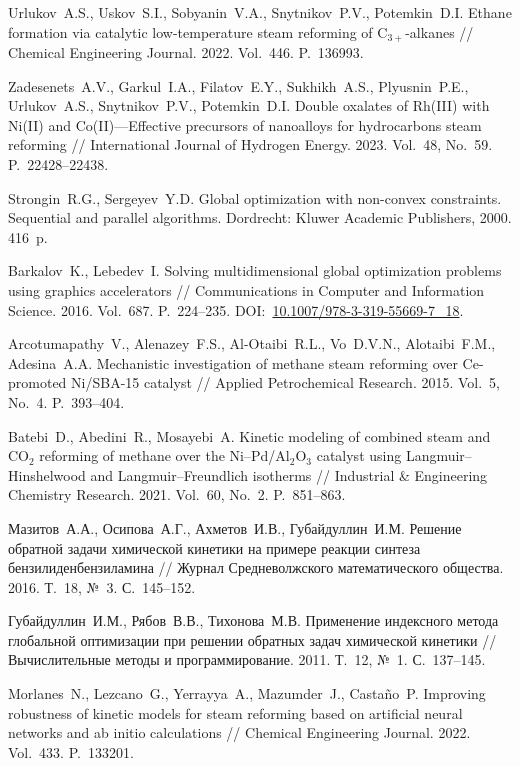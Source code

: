 \documentclass{cmi}
\begin{document}
\begin{biblio}
Urlukov~A.S., Uskov~S.I., Sobyanin~V.A., Snytnikov~P.V., Potemkin~D.I. Ethane formation via catalytic low-temperature steam reforming of C$_{3+}$-alkanes // Chemical Engineering Journal. 2022. Vol.~446. P.~136993.

Zadesenets~A.V., Garkul~I.A., Filatov~E.Y., Sukhikh~A.S., Plyusnin~P.E., Urlukov~A.S., Snytnikov~P.V., Potemkin~D.I. Double oxalates of Rh(III) with Ni(II) and Co(II)---Effective precursors of nanoalloys for hydrocarbons steam reforming // International Journal of Hydrogen Energy. 2023. Vol.~48, No.~59. P.~22428--22438.

Strongin~R.G., Sergeyev~Y.D. Global optimization with non-convex constraints. Sequential and parallel algorithms. Dordrecht: Kluwer Academic Publishers, 2000. 416~p.

Barkalov~K., Lebedev~I. Solving multidimensional global optimization problems using graphics accelerators // Communications in Computer and Information Science. 2016. Vol.~687. P.~224--235. DOI:~\href{http://dx.doi.org/10.1007/978-3-319-55669-7_18}{10.1007/978-3-319-55669-7\_18}.

Arcotumapathy~V., Alenazey~F.S., Al-Otaibi~R.L., Vo~D.V.N., Alotaibi~F.M., Adesina~A.A. Mechanistic investigation of methane steam reforming over Ce-promoted Ni/SBA-15 catalyst // Applied Petrochemical Research. 2015. Vol.~5, No.~4. P.~393--404.

Batebi~D., Abedini~R., Mosayebi~A. Kinetic modeling of combined steam and CO$_2$ reforming of methane over the Ni--Pd/Al$_2$O$_3$ catalyst using Langmuir--Hinshelwood and Langmuir--Freundlich isotherms // Industrial \& Engineering Chemistry Research. 2021. Vol.~60, No.~2. P.~851--863.

Мазитов~А.А., Осипова~А.Г., Ахметов~И.В., Губайдуллин~И.М. Решение обратной задачи химической кинетики на примере реакции синтеза бензилиденбензиламина // Журнал Средневолжского математического общества. 2016. Т.~18, №~3. С.~145--152.

Губайдуллин~И.М., Рябов~В.В., Тихонова~М.В. Применение индексного метода глобальной оптимизации при решении обратных задач химической кинетики // Вычислительные методы и программирование. 2011. Т.~12, №~1. С.~137--145.

Morlanes~N., Lezcano~G., Yerrayya~A., Mazumder~J., Castaño~P. Improving robustness of kinetic models for steam reforming based on artificial neural networks and ab initio calculations // Chemical Engineering Journal. 2022. Vol.~433. P.~133201.


\end{biblio}
\end{document}
